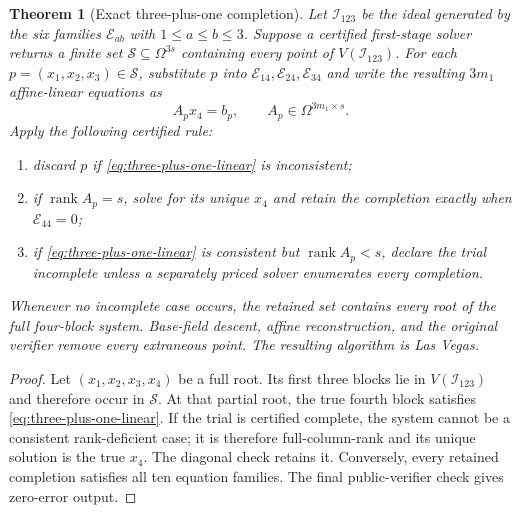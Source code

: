 \documentclass[11pt]{article}
\newtheorem{theorem}{Theorem}
\newcommand{\rank}{\operatorname{rank}}
\begin{document}
\begin{theorem}[Exact three-plus-one completion]
\label{thm:three-plus-one}
Let $\mathcal I_{123}$ be the ideal generated by the six families
$\mathcal E_{ab}$ with $1\le a\le b\le3$.  Suppose a certified first-stage
solver returns a finite set $\mathcal S\subseteq\Omega^{3s}$ containing every
point of $V(\mathcal I_{123})$.  For each
$p=(x_1,x_2,x_3)\in\mathcal S$, substitute $p$ into
$\mathcal E_{14},\mathcal E_{24},\mathcal E_{34}$ and write the resulting
$3m_1$ affine-linear equations as
\begin{equation}\label{eq:three-plus-one-linear}
 A_p x_4=b_p,
 \qquad A_p\in\Omega^{3m_1\times s}.
\end{equation}
Apply the following certified rule:
\begin{enumerate}[label=(\roman*),itemsep=2pt]
\item discard $p$ if \eqref{eq:three-plus-one-linear} is inconsistent;
\item if $\rank A_p=s$, solve for its unique $x_4$ and retain the completion
      exactly when $\mathcal E_{44}=0$;
\item if \eqref{eq:three-plus-one-linear} is consistent but
      $\rank A_p<s$, declare the trial incomplete unless a separately priced
      solver enumerates every completion.
\end{enumerate}
Whenever no incomplete case occurs, the retained set contains every root of
the full four-block system.  Base-field descent, affine reconstruction, and
the original verifier remove every extraneous point.  The resulting algorithm
is Las Vegas.
\end{theorem}

\begin{proof}
Let $(x_1,x_2,x_3,x_4)$ be a full root.  Its first three blocks lie in
$V(\mathcal I_{123})$ and therefore occur in $\mathcal S$.  At that partial
root, the true fourth block satisfies \eqref{eq:three-plus-one-linear}.  If the
trial is certified complete, the system cannot be a consistent rank-deficient
case; it is therefore full-column-rank and its unique solution is the true
$x_4$.  The diagonal check retains it.  Conversely, every retained completion
satisfies all ten equation families.  The final public-verifier check gives
zero-error output.
\end{proof}
\end{document}
